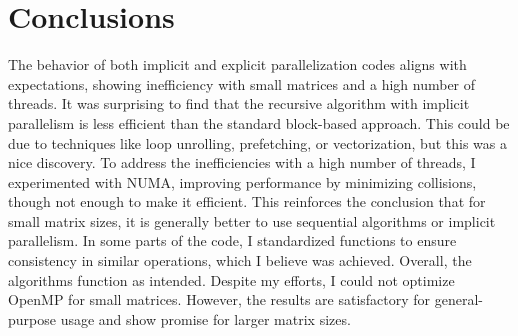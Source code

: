 \section{Conclusions}
The behavior of both implicit and explicit parallelization codes aligns with expectations, showing inefficiency with small matrices and a high number of threads. It was surprising to find that the recursive algorithm with implicit parallelism is less efficient than the standard block-based approach. This could be due to techniques like loop unrolling, prefetching, or vectorization, but this was a nice discovery.
To address the inefficiencies with a high number of threads, I experimented with NUMA, improving performance by minimizing collisions, though not enough to make it efficient. This reinforces the conclusion that for small matrix sizes, it is generally better to use sequential algorithms or implicit parallelism.
In some parts of the code, I standardized functions to ensure consistency in similar operations, which I believe was achieved. Overall, the algorithms function as intended. Despite my efforts, I could not optimize OpenMP for small matrices. However, the results are satisfactory for general-purpose usage and show promise for larger matrix sizes.

